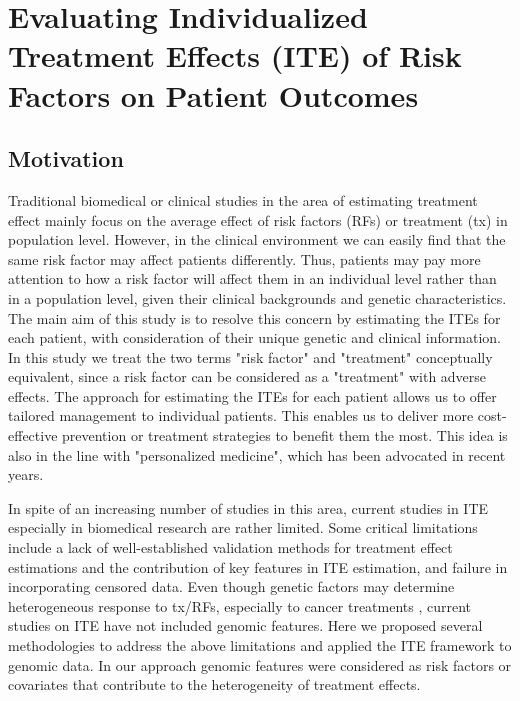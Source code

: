 \chapter{Evaluating Individualized Treatment Effects (ITE) of Risk Factors on Patient Outcomes}
\label{chap:ite}

\section{Motivation}
\label{sec:ite_mot}
  Traditional biomedical or clinical studies in the area of estimating treatment effect mainly focus on the average effect of risk factors (RFs) or treatment (tx) in population level. However, in the clinical environment we can easily find that the same risk factor may affect patients differently. Thus, patients may pay more attention to how a risk factor will affect them in an individual level rather than in a population level, given their clinical backgrounds and genetic characteristics. The main aim of this study is to resolve this concern by estimating the ITEs for each patient, with consideration of their unique genetic and clinical information. In this study we treat the two terms "risk factor" and "treatment" conceptually equivalent, since a risk factor can be considered as a "treatment" with adverse effects. The approach for estimating the ITEs for each patient allows us to offer tailored management to individual patients. This enables us to deliver more cost-effective prevention or treatment strategies to benefit them the most. This idea is also in the line with "personalized medicine", which has been advocated in recent years.

  In spite of an increasing number of studies in this area, current studies in ITE especially in biomedical research are rather limited. Some critical limitations include a lack of well-established validation methods for treatment effect estimations and the contribution of key features in ITE estimation, and failure in incorporating censored data. Even though genetic factors may determine heterogeneous response to tx/RFs, especially to cancer treatments \cite{fisher2013cancer}, current studies on ITE have not included genomic features. Here we proposed several methodologies to address the above limitations and applied the ITE framework to genomic data. In our approach genomic features were considered as risk factors or covariates that contribute to the heterogeneity of treatment effects.

